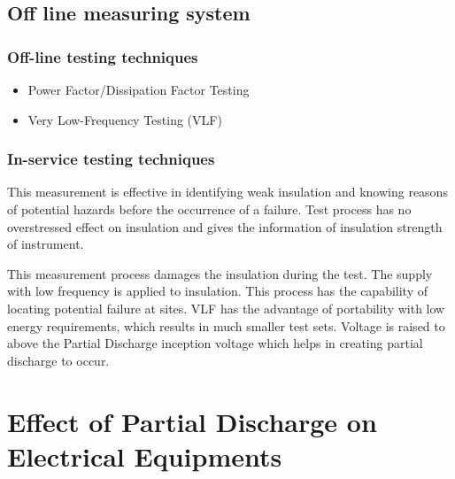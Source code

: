 \subsection{Off line measuring system}

\subsubsection{Off-line testing techniques}
\begin{itemize}
\item Power Factor/Dissipation Factor Testing
\item Very Low-Frequency Testing (VLF)
\end{itemize}

\subsubsection{In-service testing techniques}
\begin{description}[style=nextline]
\item[Power Factor/Dissipation Factor Testing] This measurement is effective in identifying weak insulation and knowing reasons of potential hazards before the occurrence of a failure. Test process has no overstressed effect on insulation and gives the information of insulation strength of instrument.

\item[Very Low Frequency (VLF) Testing] This measurement process damages the insulation during the test. The supply with low frequency is applied to insulation. This process has the capability of locating potential failure at sites. VLF has the advantage of portability with low energy requirements, which results in much smaller test sets. Voltage is raised to above the Partial Discharge inception voltage which helps in creating partial discharge to occur.
\end{description}

\section[Effect of Partial Discharge on Electrical Equipments]{Effect of Partial Discharge on\\Electrical Equipments}
